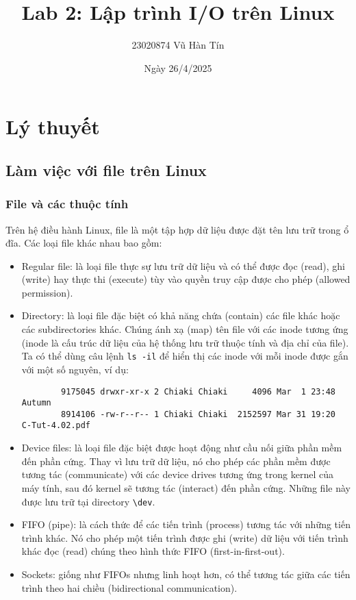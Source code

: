\documentclass{article}
\title{Lab 2: Lập trình I/O trên Linux
}
\author{23020874 Vũ Hàn Tín}
\date{Ngày 26/4/2025}
\begin{document}
\maketitle
\section{Lý thuyết}
\subsection{Làm việc với file trên Linux}
\subsubsection{File và các thuộc tính}
Trên hệ điều hành Linux, file là một tập hợp dữ liệu được đặt tên lưu trữ trong ổ đĩa. Các loại file khác nhau bao gồm:
\begin{itemize}
    \item Regular file: là loại file thực sự lưu trữ dữ liệu và có thể được đọc (read), ghi (write) hay thực thi (execute) tùy vào quyền truy cập được cho phép (allowed permission).
    \item Directory: là loại file đặc biệt có khả năng chứa (contain) các file khác hoặc các subdirectories khác. Chúng ánh xạ (map) tên file với các inode tương ứng (inode là cấu trúc dữ liệu của hệ thống lưu trữ thuộc tính và địa chỉ của file).
    \\ Ta có thể dùng câu lệnh \verb|ls -il| để hiển thị các inode với mỗi inode được gắn với một số nguyên, ví dụ:
    \begin{verbatim}
        9175045 drwxr-xr-x 2 Chiaki Chiaki     4096 Mar  1 23:48  Autumn
        8914106 -rw-r--r-- 1 Chiaki Chiaki  2152597 Mar 31 19:20  C-Tut-4.02.pdf
    \end{verbatim} 
    \item  Device files: là loại file đặc biệt được hoạt động như cầu nối giữa phần mềm đến phần cứng. Thay vì lưu trữ dữ liệu, nó cho phép các phần mềm được tương tác (communicate) với các device drives tương ứng trong kernel của máy tính, sau đó kernel sẽ tương tác (interact) đến phần cứng. Những file này 
được lưu trữ tại directory \verb|\dev|.
    \item FIFO (pipe): là cách thức để các tiến trình (process) tương tác với những tiến trình khác. Nó cho phép một tiến trình được ghi (write) dữ liệu với tiến trình khác đọc (read) chúng theo hình thức FIFO (first-in-first-out).
    \item Sockets: giống như FIFOs nhưng linh hoạt hơn, có thể tương tác giữa các tiến trình theo hai chiều (bidirectional communication).
\end{itemize}
\end{document}
